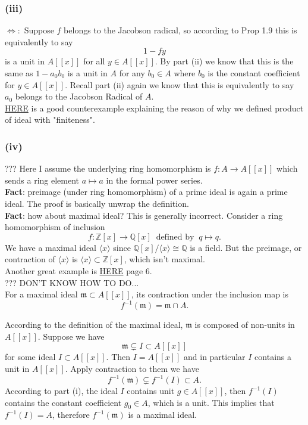 \subsubsection{(iii)} 

$\Leftrightarrow:$ Suppose $f$ belongs to the Jacobson radical, so according to Prop 1.9 this is equivalently to say
$$1-fy$$ is a unit in $A[[x]]$ for all $y\in A[[x]]$. By part (ii) we know that this is the same as $1-a_0b_0$ is a unit in $A$ for any $b_0\in A$ where $b_0$ is the constant coefficient for $y\in A[[x]]$. Recall part (ii) again we know that this is equivalently to say $a_0$ belongs to the Jacobson Radical of $A$.\\

\href{https://math.stackexchange.com/questions/367073/about-the-definition-of-extended-ideals}{HERE} is a good counterexample explaining the reason of why we defined product of ideal with "finiteness".

\subsubsection{(iv)}

??? Here I assume the underlying ring homomorphism is $f:A\to A[[x]]$ which sends a ring element $a\mapsto a$ in the formal power series.\\

\textbf{Fact}: preimage (under ring homomorphism) of a prime ideal is again a prime ideal.
The proof is basically unwrap the definition.\\

\textbf{Fact}: how about maximal ideal? This is generally incorrect.
Consider a ring homomorphism of inclusion 
$$f:\mathbb Z[x]\to \mathbb Q[x] ~\text{  defined  by  }~ q\mapsto q.$$ 
We have a maximal ideal $\langle x\rangle$ since $\mathbb Q[x]/\langle x\rangle \cong \mathbb Q$ is a field. But the preimage, or contraction of $\langle x\rangle$ is $\langle x\rangle \subset \mathbb Z[x]$, which isn't maximal.\\
Another great example is \href{https://www.dpmms.cam.ac.uk/~sjw47/Lecture1-3.pdf}{HERE} page 6.\\

??? DON'T KNOW HOW TO DO...\\

For a maximal ideal $\mathfrak m\subset A[[x]]$, its contraction under the inclusion map is 
$$f^{-1}(\mathfrak m)=\mathfrak m\cap A.$$

According to the definition of the maximal ideal, $\mathfrak m$ is composed of non-units in $A[[x]]$. Suppose we have 
$$\mathfrak m\subsetneq I\subset  A[[x]]$$ for some ideal $I\subset A[[x]]$. Then $I=A[[x]]$ and in particular $I$ contains a unit in $A[[x]]$. Apply contraction to them we have 
$$f^{-1}(\mathfrak m)\subsetneq f^{-1}(I)\subset A.$$ According to part (i), the ideal $I$ contains unit $g\in A[[x]]$, then $f^{-1}(I)$ contains the constant coefficient $g_0\in A$, which is a unit. This implies that $f^{-1}(I)=A$, therefore $f^{-1}(\mathfrak m)$ is a maximal ideal. 



